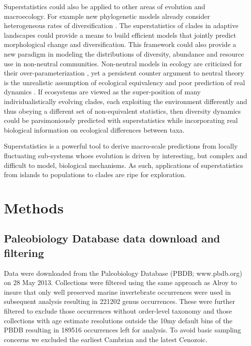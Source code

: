 \documentclass[12pt]{article}
\let\citep=\cite
\begin{document}
Superstatistics could also be applied to other areas of evolution and
macroecology.  For example new phylogenetic models already consider
heterogeneous rates of diversification
\citep[e.g.][]{rabosky2006laser}. The superstatistics of clades in
adaptive landscapes could provide a means to build efficient models
that jointly predict morphological change and diversification. This
framework could also provide a new paradigm in modeling the
distributions of diversity, abundance and resource use in non-neutral
communities. Non-neutral models in ecology are criticized for their
over-parameterization \citep{rosindell2011}, yet a persistent
counter argument to neutral theory \citep{hubbell2001} is the
unrealistic assumption of ecological equivalency
\citep{chave2004neutral} and poor prediction of real dynamics
\citep{ricklefs2006neutral}. If ecosystems are viewed as the
super-position of many individualistically evolving clades, each
exploiting the environment differently and thus obeying a different
set of non-equivalent statistics, then diversity dynamics could be
parsimoniously predicted with superstatistics while incorporating real
biological information on ecological differences between taxa.

Superstatistics is a powerful tool to derive macro-scale predictions
from locally fluctuating sub-systems whoes evolution is driven by
interesting, but complex and difficult to model, biological
mechanisms. As such, applications of superstatistics from islands to
populations to clades are ripe for exploration.


\section*{Methods}

\subsection*{Paleobiology Database data download and filtering}
Data were downloaded from the Paleobiology Database (PBDB;
www.pbdb.org) on 28 May 2013. Collections were filtered using the same
approach as Alroy \citep{alroy08} to insure that only well preserved
marine invertebrate occurrences were used in subsequent analysis
resulting in 221202 genus occurrences. These were further filtered to
exclude those occurrences without order-level taxonomy and those
collections with age estimate resolutions outside the 10my default
bins of the PBDB resulting in 189516 occurrences left for analysis. To
avoid basic sampling concerns we excluded the earliest Cambrian and
the latest Cenozoic.
\end{document}

